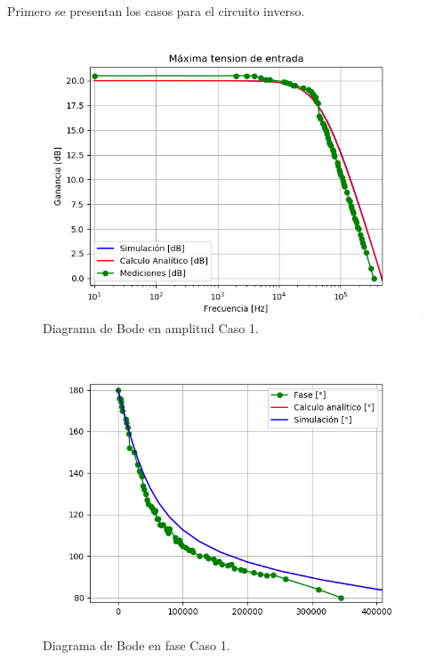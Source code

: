 Primero se presentan los casos para el circuito inverso.
\begin{figure}[H]	
	\centering
	\includegraphics[width=\textwidth]{Ejercicio1/Imagenes/BodeC1.png}
	\caption{Diagrama de Bode en amplitud Caso 1.}
	\label{fig:BodeC1}
\end{figure} 
\begin{figure}[H]	
	\centering
	\includegraphics[width=\textwidth]{Ejercicio1/Imagenes/BodephC1.png}
	\caption{Diagrama de Bode en fase Caso 1.}
	\label{fig:BodephC1}
\end{figure} 

